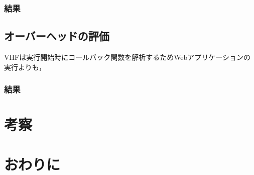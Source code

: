 \documentclass[a4paper,12pt]{jreport}
\begin{document}
\subsection{結果}

\section{オーバーヘッドの評価}
VHFは実行開始時にコールバック関数を解析するためWebアプリケーションの実行よりも，
\subsection{結果}


\chapter{考察}

\chapter{おわりに}
\end{document}
